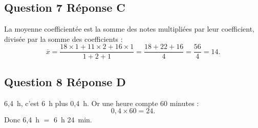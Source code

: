 \subsection*{Question 7 \quad Réponse C}

La moyenne coefficientée est la somme des notes multipliées par leur coefficient, divisée par
la somme des coefficients :
\[\overline{x} = \dfrac{18\times 1 + 11\times 2 + 16\times 1}{1 + 2 + 1} = \dfrac{18 + 22 + 16}{4} = \dfrac{56}{4} = 14.\]

\subsection*{Question 8 \quad Réponse D}

6,4~h, c'est 6~h plus 0,4~h. Or une heure compte 60 minutes :
\[0,4 \times 60 = 24.\]
Donc 6,4~h $=$ 6~h 24~min.
